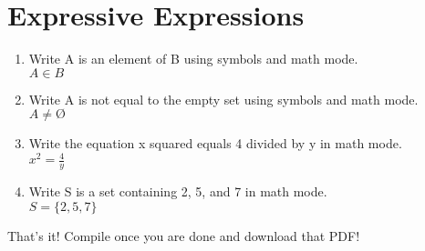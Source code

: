 \documentclass{article}
\renewcommand{\(}{\left(}
\renewcommand{\)}{\right)}
\theoremstyle{plain}
\theoremstyle{plain}
\theoremstyle{definition}
\renewcommand{\emptyset}{\text{\O}}
\begin{document}
\section{Expressive Expressions}
\begin{enumerate}
    \item Write A is an element of B using symbols and math mode.\\
    $A \in B$
    
    \item Write A is not equal to the empty set using symbols and math mode.\\
    $A \neq \emptyset$
    \item Write the equation x squared equals 4 divided by y in math mode.\\
    $x^2 = \frac{4}{y}$
    
    \item Write S is a set containing 2, 5, and 7 in math mode.\\
    $S = \{2, 5, 7\}$
\end{enumerate}


That's it! Compile once you are done and download that PDF!
\end{document}

